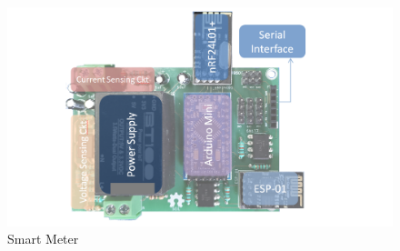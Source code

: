\begin{figure} 
	\centering
	\includegraphics[width=0.8\linewidth]{images/smartmetertagged2}
	\caption[Smart Meter]{Smart Meter}
	\label{fig:smartmetertagged2}
	\vspace*{-3ex}
\end{figure}
